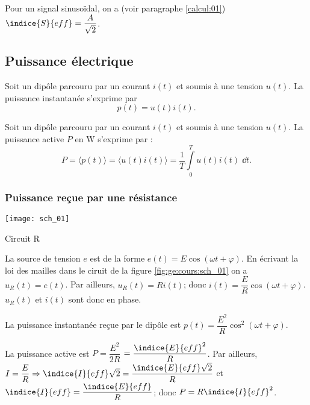 \begin{resultat}
Pour un signal sinusoïdal, on a (voir paragraphe \ref{calcul:01}) $\indice{S}{eff}= \dfrac{A}{\sqrt{2}}$.
\end{resultat}



\subsection{Puissance électrique}

\begin{defi}
Soit un dipôle parcouru par un courant $i(t)$ et soumis à une tension $u(t)$.
La puissance instantanée s'exprime par 
$$p(t)=u(t) i(t).$$

\end{defi}


\begin{defi}
Soit un dipôle parcouru par un courant $i(t)$ et soumis à une tension $u(t)$.
La puissance active $P$ en \si{W} s'exprime par :
$$P = \langle p(t) \rangle = \langle u(t) i(t) \rangle  =\dfrac{1}{T} \int\limits_{0}^{T} u(t) i(t)\; \dd t. $$
\end{defi}


\subsubsection{Puissance reçue par une résistance}
\begin{marginfigure}
\centering
\texttt{[image: sch\_01]}
\caption{Circuit R \label{fig:ge:cours:sch_01}}
\end{marginfigure}

La source de tension $e$ est de la forme $e(t)=E\cos\left(\omega t + \varphi\right)$. En écrivant la loi des mailles dans le ciruit de la figure \ref{fig:ge:cours:sch_01} on a $u_R(t)=e(t)$. Par ailleurs, $u_R(t) = R i(t)$; donc $i(t)=\dfrac{E}{R}\cos \left(\omega t + \varphi\right)$.
$u_R(t)$ et $i(t)$ sont donc en phase. 

La puissance instantanée reçue par le dipôle est $p(t) =\dfrac{E^2}{R}\cos^2 \left(\omega t + \varphi\right) $.

La puissance active est $P = \dfrac{E^2}{2R}$
$=  \dfrac{\indice{E}{eff}^2}{R}$.
Par ailleurs, $I = \dfrac{E}{R} \Rightarrow \indice{I}{eff}\sqrt{2} = \dfrac{\indice{E}{eff}\sqrt{2}}{R} $ et $\indice{I}{eff} = \dfrac{\indice{E}{eff}}{R}$; donc $P=  R\indice{I}{eff}^2$.

